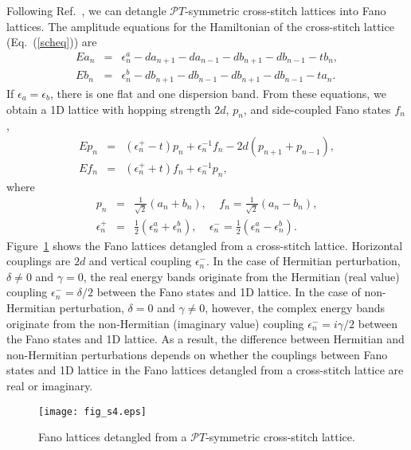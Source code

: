 \documentclass[report,epsfig,pre]{revtex4}
\newcommand{\figsizeone}{0.48}
\begin{document}
Following Ref.~\cite{Fla14}, we can detangle $\mathcal PT$-symmetric cross-stitch lattices into Fano lattices. The amplitude equations for the Hamiltonian of the cross-stitch lattice (Eq.~(\ref{scheq})) are
\begin{eqnarray}
E a_n &=& \epsilon_n^a - d a_{n+1} - d a_{n-1} - d b_{n+1} - d b_{n-1} - t b_{n}, \\
E b_n &=& \epsilon_n^b - d b_{n+1} - d b_{n-1} - d b_{n+1} - d b_{n-1} - t a_{n}.
\end{eqnarray}
If $\epsilon_a = \epsilon_b$, there is one flat and one dispersion band. From these equations, we obtain a 1D lattice with hopping strength $2 d$, $p_n$, and side-coupled Fano states $f_n$,
\begin{eqnarray}
E p_n &=& (\epsilon_n^{+} - t) p_n +\epsilon_n^{-1} f_n - 2 d (p_{n+1} + p_{n-1}), \\
E f_n &=& (\epsilon_n^{+} + t) f_n + \epsilon_n^{-1} p_n,
\end{eqnarray}
where
\begin{eqnarray}
p_n &=& \frac{1}{\sqrt{2}} (a_n + b_n), ~~~~~ f_n = \frac{1}{\sqrt{2}} (a_n - b_n), \\
\epsilon_n^{+} &=& \frac{1}{2} (\epsilon_n^a + \epsilon_n^b), ~~~~~  \epsilon_n^{-} = \frac{1}{2} (\epsilon_n^a - \epsilon_n^b).
\end{eqnarray}
Figure~\ref{fig_s4} shows the Fano lattices detangled from a cross-stitch lattice. Horizontal couplings are $2 d$ and vertical coupling $\epsilon_n^{-}$. In the case of Hermitian perturbation, $\delta \neq 0$ and $\gamma = 0$, the real energy bands originate from the Hermitian (real value) coupling $\epsilon_n^{-} = \delta/2$ between the Fano states and 1D lattice. In the case of non-Hermitian perturbation, $\delta = 0$ and $\gamma \neq 0$, however, the complex energy bands originate from the non-Hermitian (imaginary value) coupling $\epsilon_n^{-} = i \gamma/2$ between the Fano states and 1D lattice. As a result, the difference between Hermitian and non-Hermitian perturbations depends on whether the couplings between Fano states and 1D lattice in the Fano lattices detangled from a cross-stitch lattice are real or imaginary.

\begin{figure}
\begin{center}
\texttt{[image: fig\_s4.eps]}
\caption{
Fano lattices detangled from a $\mathcal PT$-symmetric cross-stitch lattice.
}
\label{fig_s4}
\end{center}
\end{figure}
\end{document}
